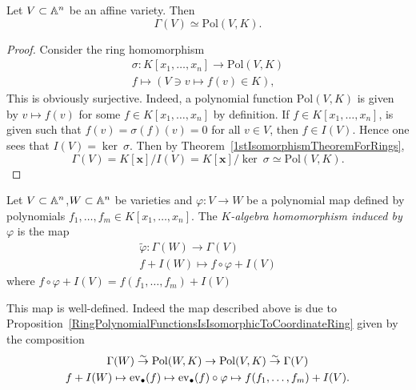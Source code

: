 \begin{proposition}\label{RingPolynomialFunctionsIsIsomorphicToCoordinateRing}
    Let $V\subset \mathbb{A}^n$ be an affine variety. Then 
    $$\Gamma(V) \simeq \text{Pol}(V,K).$$
\end{proposition}
\begin{proof}
    Consider the ring homomorphism
    \begin{gather*}
        \sigma : K[x_1,\dots,x_n] \rightarrow \text{Pol}(V,K)\\
        f \mapsto (V\ni v\mapsto f(v)\in K), 
    \end{gather*}
    This is obviously surjective. Indeed, a polynomial function $\text{Pol}(V,K)$ is given by $v\mapsto f(v)$ for some $f\in K[x_1,\dots,x_n]$ by definition. If $f\in K[x_1,\dots,x_n]$, is given such that $f(v)=\sigma(f)(v)= 0$ for all $v\in V$, then $f\in I(V)$. Hence one sees that $I(V) = \ker \ \sigma$. Then by Theorem~\ref{1stIsomorphismTheoremForRings},
    $$\Gamma(V) = K[\mathbf{x}]/I(V) = K[\mathbf{x}]/\ker\ \sigma \simeq \text{Pol}(V,K).$$
\end{proof}
\begin{definition}
    Let $V\subset \mathbb{A}^n$,$W\subset \mathbb{A}^n$ be varieties and $\varphi: V\rightarrow W$ be a polynomial map defined by polynomials $f_1,\dots,f_m\in K[x_1,\dots,x_n]$. The \textit{$K$-algebra homomorphism induced by $\varphi$} is the map 
    \begin{gather*}
        \widetilde{\varphi} : \Gamma(W)\rightarrow \Gamma(V)\\
        f + I(W) \mapsto f \circ \varphi + I(V)
    \end{gather*}
    where $f\circ \varphi + I(V) = f(f_1,\dots,f_m) + I(V)$
\end{definition}
\begin{remark}
    This map is well-defined. Indeed the map described above is due to Proposition~\ref{RingPolynomialFunctionsIsIsomorphicToCoordinateRing} given by the composition
    \begin{gather*}
    \Gamma(W) \overset{\sim}{\rightarrow} \mathrm{Pol}(W,K) \rightarrow \mathrm{Pol}(V,K) \overset{\sim}{\rightarrow} \Gamma(V)\\
    f + I(W) \mapsto \mathrm{ev}_\bullet(f) \mapsto \mathrm{ev}_\bullet(f)\circ \varphi \mapsto f(f_1,\dots,f_m)+I(V).
    \end{gather*}
\end{remark}

